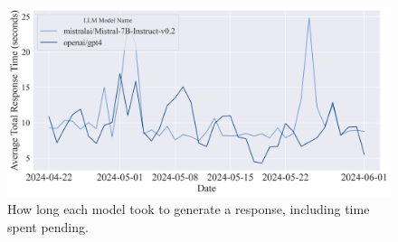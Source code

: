 \begin{figure}[H]
    \centering
    \includegraphics[width=1\textwidth]{results/plots/assets/performance-05-daily-average-response-time-per-model-including-pending-time.png}
    \caption{How long each model took to generate a response, including time spent pending.}
    \label{fig:performance_05_daily_average_response_time_including_pending_time}
\end{figure}